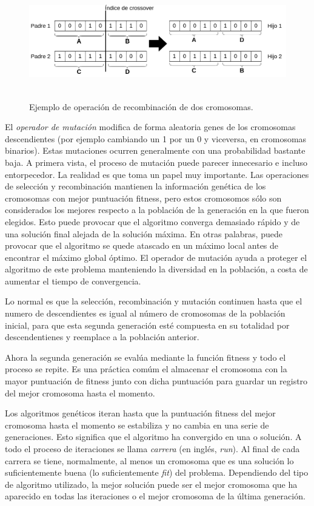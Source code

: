 \begin{figure}[H]
    \centering
    \includegraphics[width=1.0\textwidth,height=5cm]{Imagenes/CrossoverExample}
    \caption{Ejemplo de operación de recombinación de dos cromosomas.}
    \label{fig:figuraCrossover}
\end{figure}

El \textit{operador de mutación} modifica de forma aleatoria genes de los cromosomas descendientes (por ejemplo cambiando un 1 por un 0 y viceversa, en cromosomas binarios). Estas mutaciones ocurren
generalmente con una probabilidad bastante baja. A primera vista, el proceso de mutación puede parecer innecesario e incluso entorpecedor. La realidad es que toma un papel muy importante. Las operaciones
de selección y recombinación mantienen la información genética de los cromosomas con mejor puntuación fitness, pero estos cromosomos sólo son considerados los mejores respecto a la población de la generación
en la que fueron elegidos. Esto puede provocar que el algoritmo converga demasiado rápido y de una solución final alejada de la solución máxima. En otras palabras, puede provocar que el algoritmo se quede
atascado en un máximo local antes de encontrar el máximo global óptimo. El operador de mutación ayuda a proteger el algoritmo de este problema manteniendo la diversidad en la población, a costa de aumentar
el tiempo de convergencia.

Lo normal es que la selección, recombinación y mutación continuen hasta que el numero de descendientes es igual al número de cromosomas de la población inicial, para que esta segunda generación esté compuesta
en su totalidad por descendentienes y reemplace a la población anterior.

Ahora la segunda generación se evalúa mediante la función fitness y todo el proceso se repite. Es una práctica comúm el almacenar el cromosoma con la mayor puntuación de fitness junto con dicha puntuación para
guardar un registro del mejor cromosoma hasta el momento.

Los algoritmos genéticos iteran hasta que la puntuación fitness del mejor cromosoma hasta el momento se estabiliza y no cambia en una serie de generaciones. Esto significa que el algoritmo ha convergido en una
o solución. A todo el proceso de iteraciones se llama \textit{carrera} (en inglés, \textit{run}). Al final de cada carrera se tiene, normalmente, al menos un cromosoma que es una solución lo suficientemente
buena (lo suficientemente \textit{fit}) del problema. Dependiendo del tipo de algoritmo utilizado, la mejor solución puede ser el mejor cromosoma que ha aparecido en todas las iteraciones o el mejor cromosoma
de la última generación.

